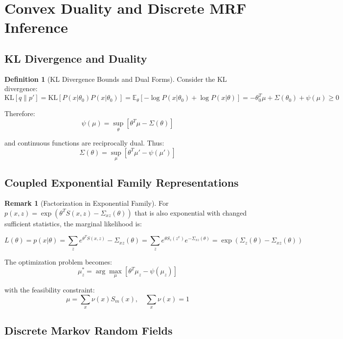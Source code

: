 \documentclass[12pt,a4paper]{article}
\theoremstyle{definition}
\newtheorem{definition}{Definition}[section]
\newtheorem{remark}{Remark}[section]
\begin{document}
\newpage

\section{Convex Duality and Discrete MRF Inference}

\subsection{KL Divergence and Duality}

\begin{definition}[KL Divergence Bounds and Dual Forms]
Consider the KL divergence:
\[
\text{KL}[q \| p'] = \text{KL}[P(x|\theta_0) P(x|\theta_0)] = \mathbb{E}_\theta[-\log P(x|\theta_0) + \log P(x|\theta)] = -\theta_0^T \mu + \Sigma(\theta_0) + \psi(\mu) \geq 0
\]

Therefore:
\[
\psi(\mu) = \sup_\theta [\theta^T \mu - \Sigma(\theta)]
\]

and continuous functions are reciprocally dual. Thus:
\[
\Sigma(\theta) = \sup_\mu [\theta^T \mu' - \psi(\mu')]
\]
\end{definition}

\subsection{Coupled Exponential Family Representations}

\begin{remark}[Factorization in Exponential Family]
For $p(x,z) = \exp(\theta^T S(x,z) - \Sigma_{xz}(\theta))$ that is also exponential with changed sufficient statistics, the marginal likelihood is:

\[
L(\theta) = p(x|\theta) = \sum_z e^{\theta^T S(x,z)} - \Sigma_{xz}(\theta) = \sum_z e^{\theta S_z(z^x)} e^{-\Sigma_{xz}(\theta)} = \exp(\Sigma_z(\theta) - \Sigma_{xz}(\theta))
\]

The optimization problem becomes:
\[
\mu_z^* = \arg\max_\mu [\theta^T \mu_z - \psi(\mu_z)]
\]

with the feasibility constraint:
\[
\mu = \sum_x \nu(x) S_m(x), \quad \sum_x \nu(x) = 1
\]
\end{remark}

\subsection{Discrete Markov Random Fields}
\end{document}

